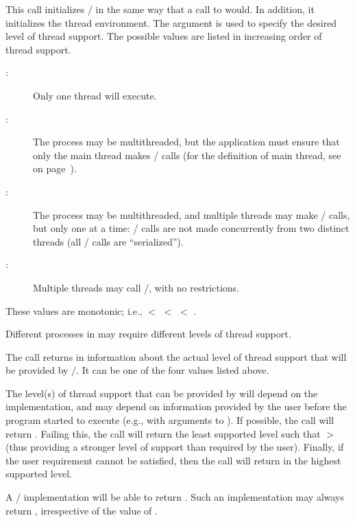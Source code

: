 This call initializes \MPI/ in the same way that a call to 
would.  In addition, it
initializes the thread environment.  The argument 
is used to specify the desired level of thread support.
The possible values are listed  in increasing order of thread support.
\begin{description}
\item[:] Only one thread will execute.
\item[:] The process may be multithreaded, but
the application must ensure that only the main thread makes \MPI/ calls
(for the definition of main thread, see 
on page~\pageref{function:mpiisthreadmain}).
\item[:] The process may be
multithreaded, and multiple threads may make \MPI/ calls, but only
one at a time: \MPI/ calls are not made concurrently from two distinct
threads (all \MPI/ calls are ``serialized'').
\item[:] Multiple threads may call \MPI/,
with no restrictions.
\end{description}
These values are monotonic; i.e.,
  $<$ 
$<$  $<$ .

Different processes in  may require different
levels of thread support.

The call returns in  information about the actual
level of  thread support that will be provided by \MPI/.  It can be one of the
four values listed above.

The level(s) of thread support that can be provided by
  will
depend on the implementation, and may depend on information provided
by the user before the program started to execute (e.g., with
arguments to ).    If possible, the call will return
\mpicode{ = }.  Failing this, the call will return the
least supported level such that  $>$  (thus providing
a stronger level of support than required by the user).  Finally, if the user
requirement cannot be satisfied, then the call will return
in  the highest supported level.


A  \MPI/ implementation will be able to return
\mpicode{ = }.
Such an implementation may always return
\mpicode{ = }, irrespective of the value
of .

